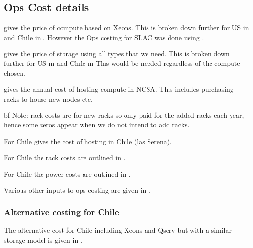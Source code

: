 \subsection{Ops Cost details}\label{sec:opsdetails}
 gives the price of compute based on Xeons.
This is broken down further for US in  and Chile in .
However the Ops costing for SLAC was done using .

 gives the price of storage using all  types that we need.
This is broken down further for US in  and Chile in 
This would be needed regardless of the compute chosen.









 gives the annual cost of hosting compute in NCSA. This includes purchasing racks to house
new nodes etc.

{bf Note:} rack costs are for new racks so only paid for the added racks each year, hence some zeros appear when we do not intend to add racks.

For Chile  gives the cost of hosting in Chile (las Serena).


For Chile the rack costs are outlined in .


For Chile the power costs are outlined in .


Various other inputs to ops costing are given in .



\subsubsection{Alternative costing for Chile}
The alternative cost for Chile including Xeons and Qserv but with a similar storage model is given in .

